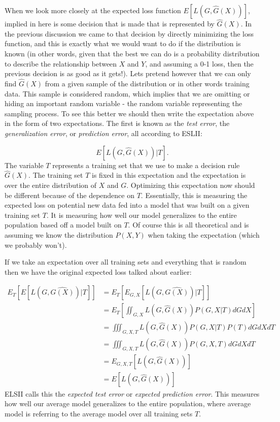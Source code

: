 When we look more closely at the expected loss function $E[L(G, \hat{G}(X))]$, implied in here is some decision that is made that is represented by $\hat{G}(X)$. In the previous discussion we came to that decision by directly minimizing the loss function, and this is exactly what we would want to do if the distribution is known (in other words, given that the best we can do is a probability distribution to describe the relationship between $X$ and $Y$, and assuming a 0-1 loss, then the previous decision is as good as it gets!). Lets pretend however that we can only find $\hat{G}(X)$ from a given sample of the distribution or in other words training data. This sample is considered random, which implies that we are omitting or hiding an important random variable - the random variable representing the sampling process. To see this better we should then write the expectation above in the form of two expectations. The first is known as the \emph{test error}, the \emph{generalization error}, or \emph{prediction error}, all according to ESLII:

\begin{equation}
E[L(G, \hat{G}(X))|T].
\end{equation}
The variable $T$ represents a training set that we use to make a decision rule $\hat{G}(X)$. The training set $T$ is fixed in this expectation and the expectation is over the entire distribution of $X$ and $G$. Optimizing this expectation now should be different because of the dependence on $T$. Essentially, this is measuring the expected loss on potential new data fed into a model that was built on a given training set $T$. It is measuring how well our model generalizes to the entire population based off a model built on $T$. Of course this is all theoretical and is assuming we know the distribution $P(X,Y)$ when taking the expectation (which we probably won't).

If we take an expectation over all training sets and everything that is random then we have the original expected loss talked about earlier:

\begin{equation}
\begin{split}
E_{T}[E[L(G, \hat{G(X)})|T]] &= E_{T}[E_{G,X}[L(G, \hat{G(X)})|T]] \\
&= E_{T}\left[\iint_{G, X} {L(G, \hat{G}(X)) P(G,X|T) dG dX}\right]\\
&= \iiint_{G, X, T} {L(G, \hat{G}(X)) P(G,X|T) P(T) dG dX dT} \\
&= \iiint_{G, X, T} {L(G, \hat{G}(X)) P(G,X,T) dG dX dT}\\
&= E_{G,X,T}[L(G, \hat{G}(X))]\\
&= E[L(G, \hat{G}(X))]
\end{split}
\end{equation}
ELSII calls this the \emph{expected test error} or \emph{expected prediction error}. This measures how well our average model generalizes to the entire population, where average model is referring to the average model over all training sets $T$. \\

